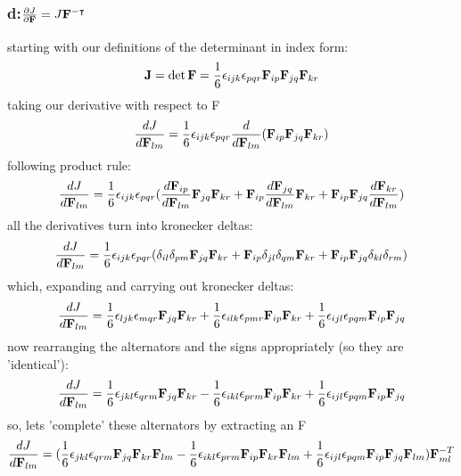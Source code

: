 \subsubsection*{d:$\frac{\partial J}{\partial \mathbf{F}} = J \mathbf{F}^{-\intercal}$}
starting with our definitions of the determinant in index form:
\begin{equation}
    \mathbf{J} = \det\mathbf{F} = \frac{1}{6}\epsilon_{ijk}\epsilon_{pqr}\mathbf{F}_{ip}\mathbf{F}_{jq}\mathbf{F}_{kr}
\end{equation}
taking our derivative with respect to F
\begin{equation}
    \frac{dJ}{d\mathbf{F}_{lm}} = \frac{1}{6}\epsilon_{ijk}\epsilon_{pqr}\frac{d}{d\mathbf{F}_{lm}}(\mathbf{F}_{ip}\mathbf{F}_{jq}\mathbf{F}_{kr})
\end{equation}
following product rule:
\begin{equation}
    \frac{dJ}{d\mathbf{F}_{lm}} = \frac{1}{6}\epsilon_{ijk}\epsilon_{pqr}(\frac{d\mathbf{F}_{ip}}{d\mathbf{F}_{lm}}\mathbf{F}_{jq}\mathbf{F}_{kr}+\mathbf{F}_{ip}\frac{d\mathbf{F}_{jq}}{d\mathbf{F}_{lm}}\mathbf{F}_{kr}+\mathbf{F}_{ip}\mathbf{F}_{jq}\frac{d\mathbf{F}_{kr}}{d\mathbf{F}_{lm}})
\end{equation}
all the derivatives turn into kronecker deltas:
\begin{equation}
    \frac{dJ}{d\mathbf{F}_{lm}} = \frac{1}{6}\epsilon_{ijk}\epsilon_{pqr}(\delta_{il}\delta_{pm}\mathbf{F}_{jq}\mathbf{F}_{kr}+\mathbf{F}_{ip}\delta_{jl}\delta_{qm}\mathbf{F}_{kr}+\mathbf{F}_{ip}\mathbf{F}_{jq}\delta_{kl}\delta_{rm})
\end{equation}
which, expanding and carrying out kronecker deltas:
\begin{equation}
    \frac{dJ}{d\mathbf{F}_{lm}} = \frac{1}{6}\epsilon_{ljk}\epsilon_{mqr}\mathbf{F}_{jq}\mathbf{F}_{kr}+\frac{1}{6}\epsilon_{ilk}\epsilon_{pmr}\mathbf{F}_{ip}\mathbf{F}_{kr}+\frac{1}{6}\epsilon_{ijl}\epsilon_{pqm}\mathbf{F}_{ip}\mathbf{F}_{jq}
\end{equation}
now rearranging the alternators and the signs appropriately (so they are 'identical'):
\begin{equation}
    \frac{dJ}{d\mathbf{F}_{lm}} = \frac{1}{6}\epsilon_{jkl}\epsilon_{qrm}\mathbf{F}_{jq}\mathbf{F}_{kr}-\frac{1}{6}\epsilon_{ikl}\epsilon_{prm}\mathbf{F}_{ip}\mathbf{F}_{kr}+\frac{1}{6}\epsilon_{ijl}\epsilon_{pqm}\mathbf{F}_{ip}\mathbf{F}_{jq}
\end{equation}
so, lets 'complete' these alternators by extracting an F
\begin{equation}
    \frac{dJ}{d\mathbf{F}_{lm}} = (\frac{1}{6}\epsilon_{jkl}\epsilon_{qrm}\mathbf{F}_{jq}\mathbf{F}_{kr}\mathbf{F}_{lm}-\frac{1}{6}\epsilon_{ikl}\epsilon_{prm}\mathbf{F}_{ip}\mathbf{F}_{kr}\mathbf{F}_{lm}+\frac{1}{6}\epsilon_{ijl}\epsilon_{pqm}\mathbf{F}_{ip}\mathbf{F}_{jq}\mathbf{F}_{lm})\mathbf{F}^{-T}_{ml}
\end{equation}
